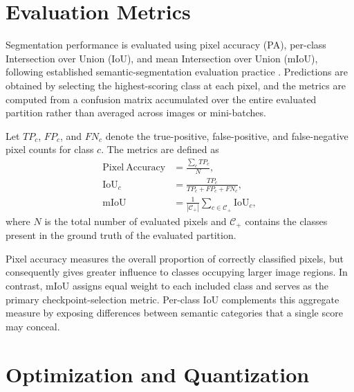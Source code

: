 \section{Evaluation Metrics}
\label{sec:segmentation-evaluation-metrics}

Segmentation performance is evaluated using pixel accuracy (PA), per-class Intersection over Union (IoU), and mean Intersection over Union (mIoU), following established semantic-segmentation evaluation practice \cite{long2015fcn}. Predictions are obtained by selecting the highest-scoring class at each pixel, and the metrics are computed from a confusion matrix accumulated over the entire evaluated partition rather than averaged across images or mini-batches.

Let \(TP_c\), \(FP_c\), and \(FN_c\) denote the true-positive, false-positive, and false-negative pixel counts for class \(c\). The metrics are defined as
\begin{equation}
    \begin{aligned}
        \mathrm{Pixel\ Accuracy}
         & = \frac{\sum_c TP_c}{N},           \\
        \mathrm{IoU}_c
         & = \frac{TP_c}{TP_c + FP_c + FN_c}, \\
        \mathrm{mIoU}
         & = \frac{1}{|\mathcal{C}_{+}|}
        \sum_{c \in \mathcal{C}_{+}} \mathrm{IoU}_c,
    \end{aligned}
    \label{eq:segmentation-evaluation-metrics}
\end{equation}
where \(N\) is the total number of evaluated pixels and \(\mathcal{C}_{+}\) contains the classes present in the ground truth of the evaluated partition.

Pixel accuracy measures the overall proportion of correctly classified pixels, but consequently gives greater influence to classes occupying larger image regions. In contrast, mIoU assigns equal weight to each included class and serves as the primary checkpoint-selection metric. Per-class IoU complements this aggregate measure by exposing differences between semantic categories that a single score may conceal.


\section{Optimization and Quantization}
\label{sec:optimization-quantization}

